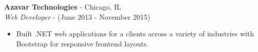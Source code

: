 \documentclass[10pt]{article}
\begin{document}
\begin{paracol}{2}
\noindent \textbf{Azavar Technologies} - Chicago, IL \\
\textit{Web Developer} - {\footnotesize(June 2013 - November 2015)}
\begin{itemize}
    \item Built .NET web applications for a clients across a variety of industries with Bootstrap for responsive frontend layouts.
\end{itemize}
    
\end{paracol}
\end{document}
